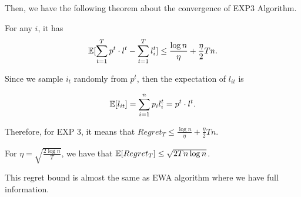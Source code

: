 \documentclass[../main.tex]{subfiles}
\begin{document}
Then, we have the following theorem about the convergence of EXP3 Algorithm. 

\begin{theorem}
	For any $i$, it has 
	\begin{equation}
	 \mathbb{E}[\sum\limits_{t=1}^T p^t\cdot l^t - \sum\limits_{t=1}^T l_i^t] \leq \frac{\log n}{\eta} + \frac{\eta}{2} Tn.
	\end{equation}	
\end{theorem}


Since we sample $i_t$ randomly from $p^t$, then the expectation of $l_{it}$ is 

\begin{equation*}
\mathbb{E}[l_{it}] = \sum\limits_{i=1}^n p_i l^t_{i} = p^t \cdot l^t.
\end{equation*} 

Therefore, for EXP 3, it means that $Regret_T \leq \frac{\log n}{\eta} + \frac{\eta}{2} Tn$.


\begin{corollary}
	For $\eta = \sqrt{\frac{2\log n}{T}}$, we have that $\mathbb{E}[Regret_T] \leq \sqrt{2Tn\log n}$.
\end{corollary}

This regret bound is almost the same as EWA algorithm where we have full information.
\end{document}
